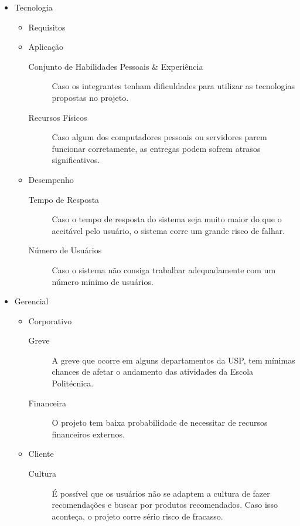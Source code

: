 \documentclass[]{article}
\begin{document}
\begin{itemize}
  
  \item Tecnologia
  \begin{itemize}
    \item Requisitos
    \begin{description}
    \end{description}
    \item Aplicação
    \begin{description}
      \item[Conjunto de Habilidades Pessoais & Experiência] Caso os integrantes tenham dificuldades para utilizar as tecnologias propostas no projeto.
      \item[Recursos Físicos] Caso algum dos computadores pessoais ou servidores parem funcionar corretamente, as entregas podem sofrem atrasos significativos.
    \end{description}
    \item Desempenho
    \begin{description}
      \item[Tempo de Resposta] Caso o tempo de resposta do sistema seja muito maior do que o aceitável pelo usuário, o sistema corre um grande risco de falhar.
      \item[Número de Usuários] Caso o sistema não consiga trabalhar adequadamente com um número mínimo de usuários.
    \end{description}
  \end{itemize}
  
  \item Gerencial
  \begin{itemize}
    \item Corporativo
    \begin{description}
      \item[Greve] A greve que ocorre em alguns departamentos da USP, tem mínimas chances de afetar o andamento das atividades da Escola Politécnica.
      \item[Financeira] O projeto tem baixa probabilidade de necessitar de recursos financeiros externos.
    \end{description}
    \item Cliente
    \begin{description}
      \item[Cultura] É possível que os usuários não se adaptem a cultura de fazer recomendações e buscar por produtos recomendados. Caso isso aconteça, o projeto corre sério risco de fracasso. 
    \end{description}
  \end{itemize}
  

\end{itemize}
\end{document}
